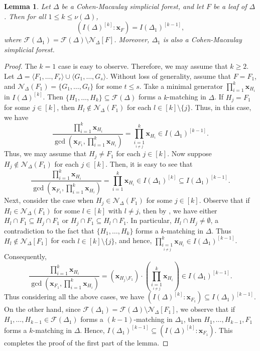 \documentclass[12pt,a4paper,reqno]{amsart}
\newtheorem{lemma}[proposition]{Lemma}
\theoremstyle{definition}
\def\D{\Delta}
\def\F{\mathcal{F}}
\def\N{\mathcal{N}}
\def\l{\langle}
\def\r{\rangle}
\def\x{\mathbf x}
\begin{document}
\begin{lemma}\label{colon lemma}
    Let $\Delta$ be a Cohen-Macaulay simplicial forest, and let $F$ be a leaf of $\Delta$. Then for all $1\le k\le \nu(\Delta)$,
    \[
    (I(\Delta)^{[k]}:\x_F)=I(\Delta_1)^{[k-1]},
    \]
    where $\F(\Delta_1)=\F(\Delta)\setminus \N_{\Delta}[F]$. Moreover, $\Delta_1$ is also a Cohen-Macaulay simplicial forest.
\end{lemma}
\begin{proof}
    The $k=1$ case is easy to observe. Therefore, we may assume that $k\ge 2$. Let $\D=\l F_1,\ldots,F_r\r\cup\l G_1,\ldots,G_s\r$. Without loss of generality, assume that $F=F_1$, and $\N_{\Delta}(F_1)=\{G_1,\ldots,G_t\}$ for some $t\le s$. Take a minimal generator $\prod_{i=1}^k\x_{H_i}$ in $I(\Delta)^{[k]}$. Then $\{H_1,\ldots,H_k\}\subseteq \F(\Delta)$ forms a $k$-matching in $\Delta$. If $H_j=F_1$ for some $j\in[k]$, then $H_l\notin \N_{\Delta}(F_1)$ for each $l\in[k]\setminus\{ j\}$. Thus, in this case, we have
    \[
     \frac{\prod_{i=1}^k\x_{H_i}}{\gcd(\x_{F_1}, \prod_{i=1}^k\x_{H_i})}=\prod_{\underset{i\neq j}{i=1}}^k\x_{H_i}\in I(\Delta_1)^{[k-1]}.
    \]
    Thus, we may assume that $H_j\neq F_1$ for each $j\in[k]$. Now suppose $H_j\notin \N_{\Delta}(F_1)$ for each $j\in [k]$. Then, it is easy to see that
\[
    \frac{\prod_{i=1}^k\x_{H_i}}{\gcd(\x_{F_1}, \prod_{i=1}^k\x_{H_i})}=\prod_{i=1}^k\x_{H_i} \in I(\Delta_1)^{[k]}\subseteq I(\Delta_1)^{[k-1]}.
    \]
    Next, consider the case when $H_j\in \N_{\Delta}(F_1)$ for some $j\in[k]$. Observe that if $H_l\in \N_{\Delta}(F_1)$ for some $l\in[k]$ with $l\neq j$, then by , we have either $H_l\cap F_1\subseteq H_j\cap F_1$ or $H_j\cap F_1\subseteq H_l\cap F_1$. In particular, $H_l\cap H_j\neq \emptyset$, a contradiction to the fact that $\{H_1,\ldots,H_k\}$ forms a $k$-matching in $\Delta$. Thus $H_l\notin \N_{\Delta}[F_1]$ for each $l\in[k]\setminus\{j\}$, and hence, $\prod_{\underset{i\neq j}{i=1}}^k\x_{H_i}\in I(\Delta_1)^{[k-1]}$. Consequently,
    \[
    \frac{\prod_{i=1}^k\x_{H_i}}{\gcd(\x_{F_1}, \prod_{i=1}^k\x_{H_i})}=(\x_{H_j\setminus F_1})\cdot \left(\prod_{\underset{i\neq j}{i=1}}^k\x_{H_i}\right)\in I(\Delta_1)^{[k-1]}.
    \]
Thus considering all the above cases, we have $(I(\Delta)^{[k]}:\x_{F_1})\subseteq I(\Delta_1)^{[k-1]}$. On the other hand, since $\F(\Delta_1)=\F(\Delta)\setminus \N_{\Delta}[F_1]$, we observe that if $H_1,\ldots,H_{k-1}\in\F(\D_1)$ forms a $(k-1)$-matching in $\D_1$, then $H_1,\ldots,H_{k-1},F_1$ forms a $k$-matching in $\D$. Hence, $I(\Delta_1)^{[k-1]}\subseteq (I(\Delta)^{[k]}:\x_{F_1})$. This completes the proof of the first part of the lemma.


\end{proof}
\end{document}
